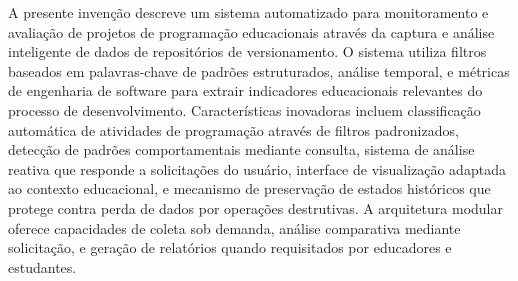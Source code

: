\documentclass{patente}
\begin{document}
A presente invenção descreve um sistema automatizado para monitoramento e avaliação de projetos de programação educacionais através da captura e análise inteligente de dados de repositórios de versionamento. O sistema utiliza filtros baseados em palavras-chave de padrões estruturados, análise temporal, e métricas de engenharia de software para extrair indicadores educacionais relevantes do processo de desenvolvimento. Características inovadoras incluem classificação automática de atividades de programação através de filtros padronizados, detecção de padrões comportamentais mediante consulta, sistema de análise reativa que responde a solicitações do usuário, interface de visualização adaptada ao contexto educacional, e mecanismo de preservação de estados históricos que protege contra perda de dados por operações destrutivas. A arquitetura modular oferece capacidades de coleta sob demanda, análise comparativa mediante solicitação, e geração de relatórios quando requisitados por educadores e estudantes.
\end{document}
